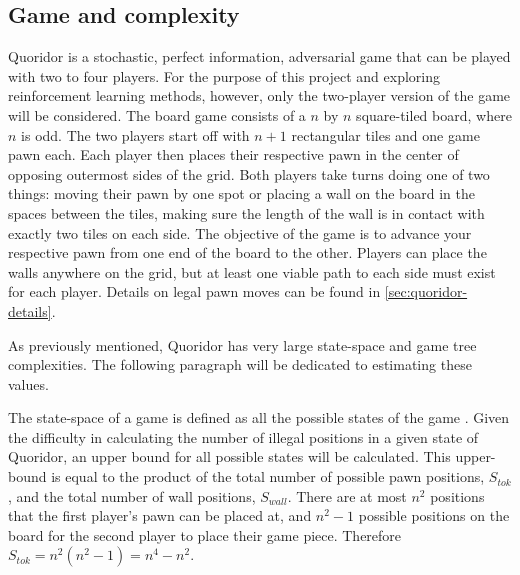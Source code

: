 \documentclass[journal, a4paper]{IEEEtran}
\begin{document}
\subsection{Game and complexity}
\label{ssec:complexity}

Quoridor is a stochastic, perfect information, adversarial game that can be played with two to four players. For the purpose of this project and exploring reinforcement learning methods, however, only the two-player version of the game will be considered. The board game consists of a $n$ by $n$ square-tiled board, where $n$ is odd. 
The two players start off with $n+1$ rectangular tiles and one game pawn each. Each player then places their respective pawn in the center of opposing outermost sides of the grid. Both players take turns doing one of two things: moving their pawn by one spot or placing a wall on the board in the spaces between the tiles, making sure the length of the wall is in contact with exactly two tiles on each side. 
The objective of the game is to advance your respective pawn from one end of the board to the other. Players can place the walls anywhere on the grid, but at least one viable path to each side must exist for each player. Details on legal pawn moves can be found in \ref{sec:quoridor-details}.

As previously mentioned, Quoridor has very large state-space and game tree complexities. The following paragraph will be dedicated to estimating these values. 

The state-space of a game is defined as all the possible states of the game \cite{heuristic-agent}. Given the difficulty in calculating the number of illegal positions in a given state of Quoridor, an upper bound for all possible states will be calculated. 
This upper-bound is equal to the product of the total number of possible pawn positions, $S_{tok}$, and the total number of wall positions, $S_{wall}$.  There are at most $n^{2}$ positions that the first player's pawn can be placed at, and $n^{2} -1$ possible positions on the board for the second player to place their game piece. Therefore $S_{tok} = n^{2}(n^{2}-1) = n^{4} - n^{2}$.
\end{document}
